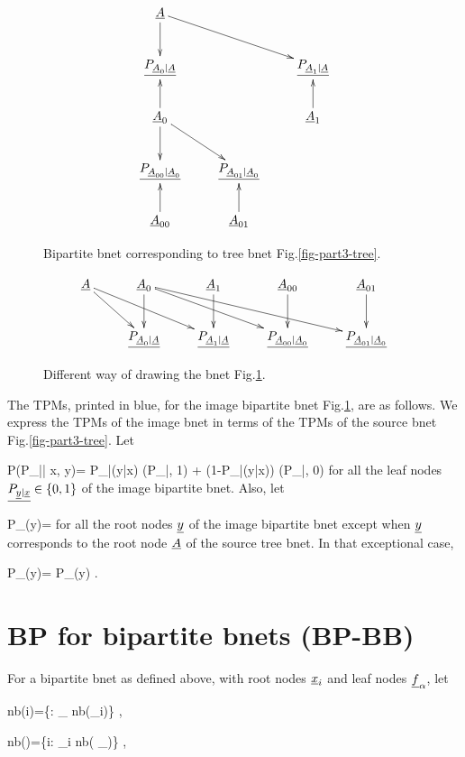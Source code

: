 \begin{figure}[h!]
$$\xymatrix{
\rvA\ar[d]\ar[rrd]
\\
\ul{P_{\rvA_0|\rvA}}&&\ul{P_{\rvA_1|\rvA}}
\\
\rvA_0\ar[u]\ar[d]\ar[rd]&&\rvA_1\ar[u]
\\
\ul{P_{\rvA_{00}|\rvA_0}}&\ul{P_{\rvA_{01}|\rvA_0}}
\\
\rvA_{00}\ar[u]&\rvA_{01}\ar[u]
}
$$
\caption{Bipartite bnet
corresponding
to tree bnet Fig.\ref{fig-part3-tree}.}
\label{fig-part3-tree-junc-tree}
\end{figure}

\begin{figure}[h!]
\centering
$$\xymatrix{
\rvA\ar[dr]\ar[drr]
&\rvA_{0}\ar[d]\ar[drr]\ar[drrr]
&\rvA_{1}\ar[d]
&\rvA_{00}\ar[d]
&\rvA_{01}\ar[d]
\\
&\ul{P_{\rvA_{0}|\rvA}}
&\ul{P_{\rvA_{1}|\rvA}}
&\ul{P_{\rvA_{00}|\rvA_0}}
&\ul{P_{\rvA_{01}|\rvA_0}}
}$$
\caption{
Different
way of drawing
the bnet Fig.\ref{fig-part3-tree-junc-tree}.}
\label{fig-part3-tree-bip-bnet}
\end{figure}

The TPMs, printed in blue,
for the image bipartite bnet
Fig.\ref{fig-part3-tree-junc-tree},
are as follows. We express the
TPMs of the image bnet
in terms of the
TPMs of the source bnet
Fig.\ref{fig-part3-tree}. Let

\beq\color{blue}
P(P_{\rvy|\rvx}| x, y)=
P_{\rvy|\rvx}(y|x)
\delta(P_{\rvy|\rvx}, 1)
+
(1-P_{\rvy|\rvx}(y|x))
\delta(P_{\rvy|\rvx}, 0)
\eeq
for all the
leaf
nodes $\ul{P_{\rvy|\rvx}}\in \bool$ of the
image bipartite bnet.
Also, let

\beq\color{blue}
P_\rvy(y)= 
\;
\eeq
for all the root nodes
$\rvy$ of the
image bipartite bnet
except when
$\rvy$ corresponds to
the root node $\rvA$
of the source tree bnet.
In that exceptional case,

\beq\color{blue}
P_\rvy(y)= P_\rvA(y)
\;.
\eeq


\section{BP for
bipartite bnets (BP-BB)}
For
a bipartite
bnet as defined above,
with
root nodes $\rvx_i$
and leaf nodes $\rvf_\alp$,
let


\beq
nb(i)=\{\alp: \rvf_\alpha\in
nb(\rvx_i)\}
\;,
\eeq

\beq
nb(\alpha)=\{i: \rvx_i\in
nb( \rvf_\alpha)\}
\;,
\eeq

